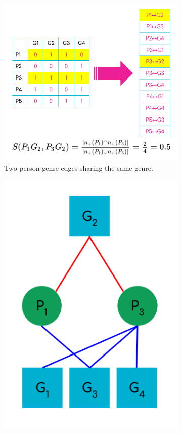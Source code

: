 \documentclass[a4paper,12pt]{extarticle}
\begin{document}
\begin{figure}[ht!]
     \centering
     \begin{subfigure}[b]{0.6\textwidth}
        \includegraphics[width=1.0\textwidth]{Figs/Toy/link-clust-toy1.png}
        \caption{Two person-genre edges sharing the same genre.}
        \label{fig:link-toy1}
    \end{subfigure} 
     \begin{subfigure}[b]{0.3\textwidth}
        \includegraphics[width=1.0\textwidth]{Figs/Toy/link-clust-toy2.png}

\end{subfigure}
\end{figure}
\end{document}
